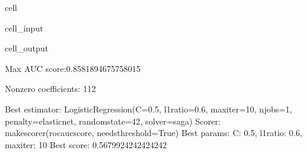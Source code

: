 \documentclass[letterpaper,10pt,english]{jupyterBook}
\begin{document}
\begin{sphinxuseclass}{cell}
\begin{sphinxVerbatimInput}
\begin{sphinxuseclass}{cell_input}
\end{sphinxuseclass}\end{sphinxVerbatimInput}
\begin{sphinxVerbatimOutput}

\begin{sphinxuseclass}{cell_output}
\begin{sphinxVerbatim}[commandchars=\\\{\}]
Max AUC score:0.8581894675758015

Non\PYGZhy{}zero coefficients: 112

Best estimator: LogisticRegression(C=0.5, l1\PYGZus{}ratio=0.6, max\PYGZus{}iter=10, n\PYGZus{}jobs=\PYGZhy{}1,
                   penalty=\PYGZsq{}elasticnet\PYGZsq{}, random\PYGZus{}state=42, solver=\PYGZsq{}saga\PYGZsq{})
Scorer: make\PYGZus{}scorer(roc\PYGZus{}auc\PYGZus{}score, needs\PYGZus{}threshold=True)
Best params: \PYGZob{}\PYGZsq{}C\PYGZsq{}: 0.5, \PYGZsq{}l1\PYGZus{}ratio\PYGZsq{}: 0.6, \PYGZsq{}max\PYGZus{}iter\PYGZsq{}: 10\PYGZcb{}
Best score: 0.5679924242424242
\end{sphinxVerbatim}


\end{sphinxuseclass}
\end{sphinxVerbatimOutput}
\end{sphinxuseclass}
\end{document}
